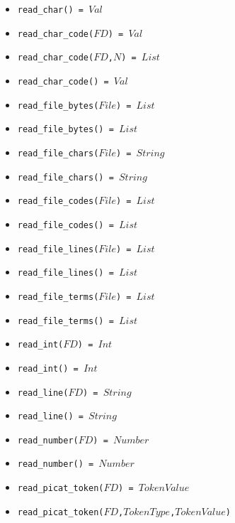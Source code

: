 \documentclass[10pt]{article}
\begin{document}
\begin{multicols}{2}
\begin{scriptsize}
\begin{itemize}
   \item \texttt{read\_char() = $Val$}
   \item \texttt{read\_char\_code($FD$) = $Val$}
   \item \texttt{read\_char\_code($FD$,$N$) = $List$}
   \item \texttt{read\_char\_code() = $Val$}
   \item \texttt{read\_file\_bytes($File$) = $List$}
   \item \texttt{read\_file\_bytes() = $List$}
   \item \texttt{read\_file\_chars($File$) = $String$}
   \item \texttt{read\_file\_chars() = $String$}
   \item \texttt{read\_file\_codes($File$) = $List$}
   \item \texttt{read\_file\_codes() = $List$}
   \item \texttt{read\_file\_lines($File$) = $List$}
   \item \texttt{read\_file\_lines() = $List$}
   \item \texttt{read\_file\_terms($File$) = $List$}
   \item \texttt{read\_file\_terms() = $List$}
   \item \texttt{read\_int($FD$) = $Int$}
   \item \texttt{read\_int() = $Int$}
   \item \texttt{read\_line($FD$) = $String$}
   \item \texttt{read\_line() = $String$}
   \item \texttt{read\_number($FD$) = $Number$}
   \item \texttt{read\_number() = $Number$}
   \item \texttt{read\_picat\_token($FD$) = $TokenValue$}
   \item \texttt{read\_picat\_token($FD$,$TokenType$,$TokenValue$)}

\end{itemize}
\end{scriptsize}
\end{multicols}
\end{document}
